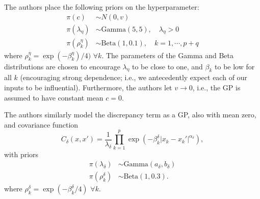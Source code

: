 \documentclass{article}
\begin{document}
The authors place the following priors on the hyperparameter:
\begin{align}
\pi (c) &\sim N(0,v)\\
\pi(\lambda_\eta) &\sim \mathrm{Gamma}(5,5),\quad\lambda_\eta>0\\
\pi\left(\rho_k^\eta\right) &\sim \mathrm{Beta}(1,0.1),\quad k=1,\cdots,p+q
\end{align}
where $\rho_k^\eta=\exp(-\beta_k^\eta)/4)$ $\forall k$. The parameters of the Gamma and Beta distributions are chosen to encourage $\lambda_\eta$ to be close to one, and $\beta_k$ to be low for all $k$ (encouraging strong dependence; i.e., we antecedently expect each of our inputs to be influential). Furthermore, the authors let $v\to0$, i.e., the GP is assumed to have constant mean $c=0$.

The authors similarly model the discrepancy term as a GP, also with mean zero, and covariance function
\begin{equation}
C_\delta(x,x') = \frac 1{\lambda_\delta} \prod_{k=1}^p
\exp\left( -\beta_k^\delta |x_k-x_k'|^{\alpha_\delta} \right),
\end{equation}
with priors
\begin{align}
\pi(\lambda_\delta) &\sim \mathrm{Gamma}(a_\delta,b_\delta)\\
\pi(\rho^\delta_k) &\sim \mathrm{Beta}(1,0.3).
\end{align}
where $\rho_k^\delta=\exp(-\beta_k^\delta/4)$ $\forall k$.
\end{document}
